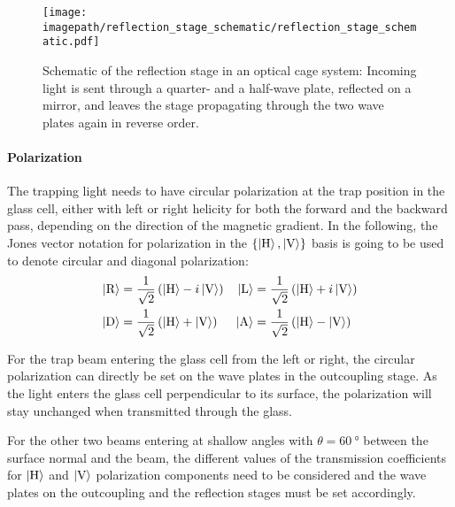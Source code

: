\begin{figure}
    \centering
    \texttt{[image: \\imagepath/reflection\_stage\_schematic/reflection\_stage\_schematic.pdf]}
    \caption{Schematic of the reflection stage in an optical cage system: Incoming light is sent through a quarter- and a half-wave plate, reflected on a mirror, and leaves the stage propagating through the two wave plates again in reverse order.}
    \label{fig:reflection_stage_schematic}
\end{figure}

\paragraph{Polarization}
The trapping light needs to have circular polarization at the trap position in the glass cell, either with left or right helicity for both the forward and the backward pass, depending on the direction of the magnetic gradient. In the following, the Jones vector notation for polarization in the $\{\Ket{\text{H}}, \Ket{\text{V}}\}$ basis is going to be used to denote circular and diagonal polarization:
\begin{align}
        \Ket{\text{R}} &= \frac{1}{\sqrt{2}} \left(\Ket{\text{H}} - i \Ket{\text{V}}\right)  & \Ket{\text{L}} &= \frac{1}{\sqrt{2}} \left(\Ket{\text{H}} + i \Ket{\text{V}}\right) \\
        \Ket{\text{D}} &= \frac{1}{\sqrt{2}} \left(\Ket{\text{H}} + \Ket{\text{V}}\right)  &  \Ket{\text{A}} &= \frac{1}{\sqrt{2}} \left(\Ket{\text{H}} - \Ket{\text{V}}\right)
\end{align}

For the trap beam entering the glass cell from the left or right, the circular polarization can directly be set on the wave plates in the outcoupling stage. As the light enters the glass cell perpendicular to its surface, the polarization will stay unchanged when transmitted through the glass.

For the other two beams entering at shallow angles with $\theta = \SI{60}{\degree}$ between the surface normal and the beam, the different values of the transmission coefficients for $\Ket{\text{H}}$ and $\Ket{\text{V}}$ polarization components need to be considered and the wave plates on the outcoupling and the reflection stages must be set accordingly.

